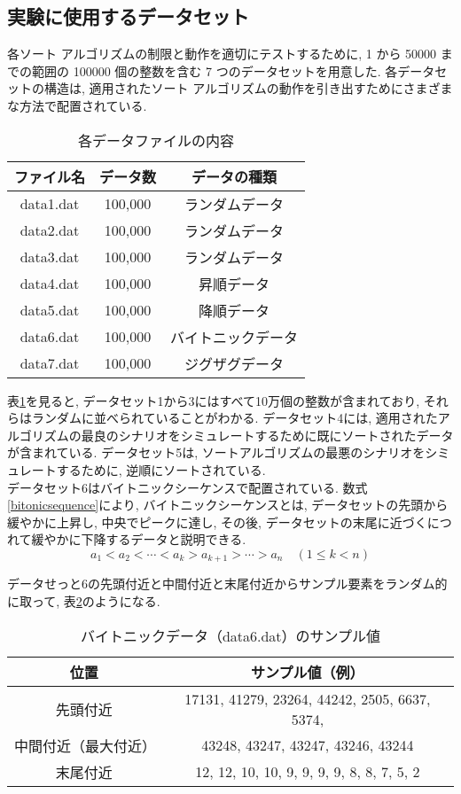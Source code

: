\documentclass[a4j, 11pt]{jarticle}
\begin{document}
\subsection{実験に使用するデータセット}
各ソート アルゴリズムの制限と動作を適切にテストするために, 1 から 50000 までの範囲の 100000 個の整数を含む 7 つのデータセットを用意した. 各データセットの構造は, 適用されたソート アルゴリズムの動作を引き出すためにさまざまな方法で配置されている. 
\begin{table}[htbp]
  \centering
  \caption{各データファイルの内容}
  \begin{tabular}{|c|c|c|}
    \hline
    ファイル名 & データ数 & データの種類 \\
    \hline
    data1.dat & 100,000 & ランダムデータ \\
    data2.dat & 100,000 & ランダムデータ \\
    data3.dat & 100,000 & ランダムデータ \\
    data4.dat & 100,000 & 昇順データ \\
    data5.dat & 100,000 & 降順データ \\
    data6.dat & 100,000 & バイトニックデータ \\
    data7.dat & 100,000 & ジグザグデータ \\
    \hline
  \end{tabular}\label{tab:dataset-summary}
\end{table}
表\ref{tab:dataset-summary}を見ると, データセット1から3にはすべて10万個の整数が含まれており, それらはランダムに並べられていることがわかる. データセット4には, 適用されたアルゴリズムの最良のシナリオをシミュレートするために既にソートされたデータが含まれている. データセット5は, ソートアルゴリズムの最悪のシナリオをシミュレートするために, 逆順にソートされている. \\

データセット6はバイトニックシーケンスで配置されている. 数式\ref{bitonicsequence}により, バイトニックシーケンスとは, データセットの先頭から緩やかに上昇し, 中央でピークに達し, その後, データセットの末尾に近づくにつれて緩やかに下降するデータと説明できる. \\
\begin{equation}\label{bitonicsequence}
a_1 < a_2 < \cdots < a_k > a_{k+1} > \cdots > a_n
\quad (1 \leq k < n)
\end{equation}

データせっと6の先頭付近と中間付近と末尾付近からサンプル要素をランダム的に取って, 表\ref{tab:data6-sample}のようになる. 
\begin{table}[H]
  \centering
  \caption{バイトニックデータ（data6.dat）のサンプル値}
  \begin{tabular}{|c|c|}
    \hline
    位置 & サンプル値（例） \\
    \hline
    先頭付近 & 17131, 41279, 23264, 44242, 2505, 6637, 5374,\\
    中間付近（最大付近） & 43248, 43247, 43247, 43246, 43244 \\
    末尾付近 & 12, 12, 10, 10, 9, 9, 9, 9, 8, 8, 7, 5, 2 \\
    \hline
  \end{tabular}\label{tab:data6-sample}
\end{table}
\end{document}
